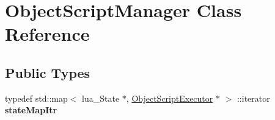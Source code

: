 \hypertarget{classObjectScriptManager}{
\section{\-Object\-Script\-Manager \-Class \-Reference}
\label{d4/d09/classObjectScriptManager}
}
\subsection*{\-Public \-Types}
\begin{DoxyCompactItemize}
\item 
\hypertarget{classObjectScriptManager_aeb0d9d1724d8aaf569e985b8cfc7ad7a}{
typedef std\-::map$<$ lua\-\_\-\-State \*
$\ast$, \hyperlink{classObjectScriptExecutor}{\-Object\-Script\-Executor} $\ast$ $>$\*
\-::iterator {\bfseries state\-Map\-Itr}}
\label{d4/d09/classObjectScriptManager_aeb0d9d1724d8aaf569e985b8cfc7ad7a}

\end{DoxyCompactItemize}

